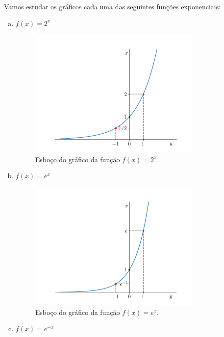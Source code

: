\begin{ex}
  Vamos estudar os gráficos cada uma das seguintes funções exponenciais:
  \begin{enumerate}[a)]
  \item $\displaystyle f(x) = 2^x$
    \begin{figure}[H]
      \centering
      \includegraphics[width=0.8\textwidth]{./cap_funcao/dados/fig_funexp_2/fig}
      \caption{Esboço do gráfico da função $f(x) = 2^x$.}
    \end{figure}    
  \item $\displaystyle f(x) = e^x$
    \begin{figure}[H]
      \centering
      \includegraphics[width=0.8\textwidth]{./cap_funcao/dados/fig_funexp_e/fig}
      \caption{Esboço do gráfico da função $f(x) = e^x$.}
    \end{figure}    
  \item $\displaystyle f(x) = e^{-x}$
    \begin{figure}[H]
      \centering

\end{figure}
\end{enumerate}
\end{ex}
